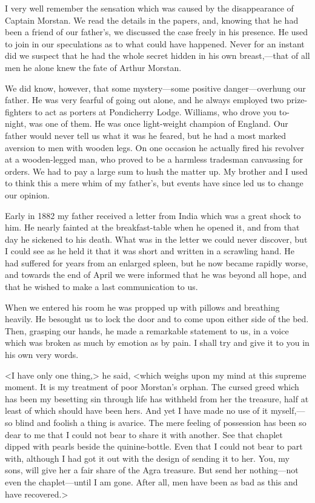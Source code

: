 I very well remember the sensation which was caused by the disappearance of Captain Morstan. We read the details in the papers, and, knowing that he had been a friend of our father's, we discussed the case freely in his presence. He used to join in our speculations as to what could have happened. Never for an instant did we suspect that he had the whole secret hidden in his own breast,—that of all men he alone knew the fate of Arthur Morstan.

We did know, however, that some mystery—some positive danger—overhung our father. He was very fearful of going out alone, and he always employed two prize-fighters to act as porters at Pondicherry Lodge. Williams, who drove you to-night, was one of them. He was once light-weight champion of England. Our father would never tell us what it was he feared, but he had a most marked aversion to men with wooden legs. On one occasion he actually fired his revolver at a wooden-legged man, who proved to be a harmless tradesman canvassing for orders. We had to pay a large sum to hush the matter up. My brother and I used to think this a mere whim of my father's, but events have since led us to change our opinion.

Early in 1882 my father received a letter from India which was a great shock to him. He nearly fainted at the breakfast-table when he opened it, and from that day he sickened to his death. What was in the letter we could never discover, but I could see as he held it that it was short and written in a scrawling hand. He had suffered for years from an enlarged spleen, but he now became rapidly worse, and towards the end of April we were informed that he was beyond all hope, and that he wished to make a last communication to us.

When we entered his room he was propped up with pillows and breathing heavily. He besought us to lock the door and to come upon either side of the bed. Then, grasping our hands, he made a remarkable statement to us, in a voice which was broken as much by emotion as by pain. I shall try and give it to you in his own very words.

<I have only one thing,> he said, <which weighs upon my mind at this supreme moment. It is my treatment of poor Morstan's orphan. The cursed greed which has been my besetting sin through life has withheld from her the treasure, half at least of which should have been hers. And yet I have made no use of it myself,—so blind and foolish a thing is avarice. The mere feeling of possession has been so dear to me that I could not bear to share it with another. See that chaplet dipped with pearls beside the quinine-bottle. Even that I could not bear to part with, although I had got it out with the design of sending it to her. You, my sons, will give her a fair share of the Agra treasure. But send her nothing—not even the chaplet—until I am gone. After all, men have been as bad as this and have recovered.>


